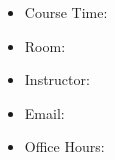 \begin{itemize}[label={},leftmargin=0pt]
    \item Course Time: \coursetime
    \item Room: \room %
    \item Instructor: \instructor
    \item Email: \email
    \item Office Hours: \officehours
\end{itemize}